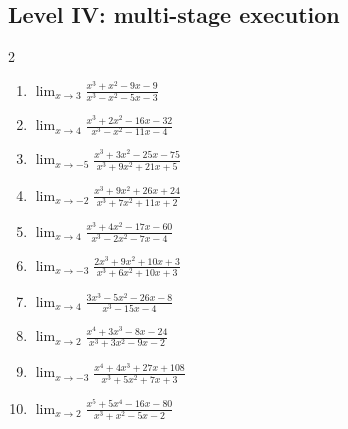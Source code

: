 \documentclass[11pt,oneside]{book}
\begin{document}
\subsection*{Level IV: multi-stage execution}
\begin{multicols}{2}
\begin{enumerate}[leftmargin=*,label=\textbf{\arabic*.},itemsep=0.65\baselineskip]
\item $\displaystyle \lim_{x \to 3} \frac{x^{3} + x^{2} - 9 x - 9}{x^{3} - x^{2} - 5 x - 3}$
\item $\displaystyle \lim_{x \to 4} \frac{x^{3} + 2 x^{2} - 16 x - 32}{x^{3} - x^{2} - 11 x - 4}$
\item $\displaystyle \lim_{x \to -5} \frac{x^{3} + 3 x^{2} - 25 x - 75}{x^{3} + 9 x^{2} + 21 x + 5}$
\item $\displaystyle \lim_{x \to -2} \frac{x^{3} + 9 x^{2} + 26 x + 24}{x^{3} + 7 x^{2} + 11 x + 2}$
\item $\displaystyle \lim_{x \to 4} \frac{x^{3} + 4 x^{2} - 17 x - 60}{x^{3} - 2 x^{2} - 7 x - 4}$
\item $\displaystyle \lim_{x \to -3} \frac{2 x^{3} + 9 x^{2} + 10 x + 3}{x^{3} + 6 x^{2} + 10 x + 3}$
\item $\displaystyle \lim_{x \to 4} \frac{3 x^{3} - 5 x^{2} - 26 x - 8}{x^{3} - 15 x - 4}$
\item $\displaystyle \lim_{x \to 2} \frac{x^{4} + 3 x^{3} - 8 x - 24}{x^{3} + 3 x^{2} - 9 x - 2}$
\item $\displaystyle \lim_{x \to -3} \frac{x^{4} + 4 x^{3} + 27 x + 108}{x^{3} + 5 x^{2} + 7 x + 3}$
\item $\displaystyle \lim_{x \to 2} \frac{x^{5} + 5 x^{4} - 16 x - 80}{x^{3} + x^{2} - 5 x - 2}$
\end{enumerate}
\end{multicols}
\end{document}
